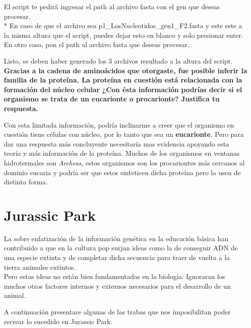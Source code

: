 \documentclass[letter]{article}
\begin{document}
El script te pedirá ingresar el path al archivo fasta con el gen que deseas procesar. \\
* En caso de que el archivo sea p1\_LosNucleotidos\_gen1\_F2.fasta y este este a la misma altura que el script, puedes dejar esto en blanco y solo presionar enter.
En otro caso, pon el path al archivo fasta que deseas procesar.

Listo, se deben haber generado los 3 archivos resultado a la altura del script. \\

\textbf{Gracias a la cadena de aminoácidos que otorgaste, fue posible inferir la familia de la proteína. La proteína en cuestión está relacionada con la formación del núcleo celular ¿Con ésta información podrías decir si el organismo se trata de un eucarionte o procarionte? Justifica tu respuesta.}

Con esta limitada información, podría inclinarme a creer que el organismo en cuestión tiene células con núcleo, por lo tanto que sea un \textbf{eucarionte}. 
Pero para dar una respuesta más concluyente necesitaría mas evidencia apoyando esta teoría y más información de la proteína.
Muchos de los organismos en ventanas hidrotermales son \textit{Archeas}, estos organismos son los procariontes más cercanos al dominio eucaria \cite{archeas} y podría ser que estos sinteticen dicha proteína pero la usen de distinta forma.

\newpage

\section{Jurassic Park}

La sobre enfatización de la información genética en la educación básica han contribuido a que en la cultura pop surjan ideas como la de conseguir ADN de una especie extinta y de completar dicha secuencia para traer de vuelta a la tierra animales extintos. \\
Pero estas ideas no están bien fundamentadas en la biología. Ignoraran los muchos otros factores internos y externos necesarios para el desarrollo de un animal.

A continuación presentare algunas de las trabas que nos imposibilitan poder recrear lo sucedido en Jurassic Park.
\end{document}
